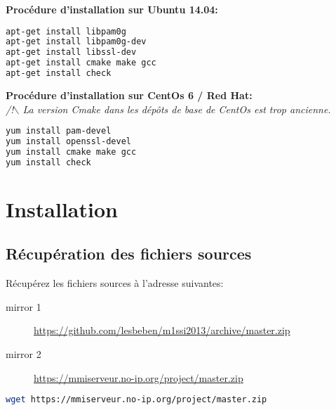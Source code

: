 \documentclass{"../../../res/univ-projet"}
\begin{document}
\textbf{Procédure d'installation sur Ubuntu 14.04:}\\
\begin{lstlisting}[language=bash, backgroundcolor=\color{black}, basicstyle=\color{white}]
apt-get install libpam0g
apt-get install libpam0g-dev
apt-get install libssl-dev
apt-get install cmake make gcc
apt-get install check
\end{lstlisting}

\textbf{Procédure d'installation sur CentOs 6 / Red Hat:}\\
\textit{/!$\backslash$ La version Cmake dans les dépôts de base de CentOs est trop ancienne.}
\begin{lstlisting}[language=bash, backgroundcolor=\color{black}, basicstyle=\color{white}]
yum install pam-devel
yum install openssl-devel
yum install cmake make gcc
yum install check
\end{lstlisting}

\newpage

\section{Installation}
\subsection{Récupération des fichiers sources}
Récupérez les fichiers sources à l'adresse suivantes:
\begin{description}
\item[mirror 1] \href{https://github.com/lesbeben/m1ssi2013/archive/master.zip}{https://github.com/lesbeben/m1ssi2013/archive/master.zip}\\

\item[mirror 2] \href{https://mmiserveur.no-ip.org/project/master.zip}{https://mmiserveur.no-ip.org/project/master.zip}\\
\end{description}

\begin{lstlisting}[language=bash, backgroundcolor=\color{black}, basicstyle=\color{white}]
wget https://mmiserveur.no-ip.org/project/master.zip
\end{lstlisting}
\end{document}
